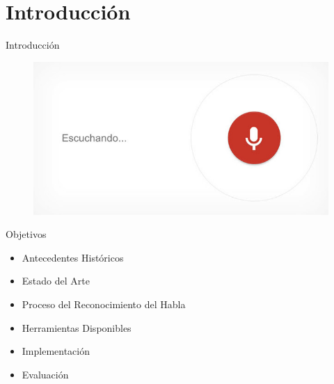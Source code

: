 \section{Introducci\'on}

\begin{frame}{Introducci\'on}

\begin{figure}[H]
\centering
\includegraphics[width=0.7\linewidth]{./graphics/speech_intro.jpg}
\end{figure}


\end{frame}

\begin{frame}{Objetivos}
\begin{itemize}
    \item Antecedentes Hist\'oricos
    \item Estado del Arte
    \item Proceso del Reconocimiento del Habla
    \item Herramientas Disponibles
    \item Implementaci\'on
    \item Evaluaci\'on
\end{itemize}
\end{frame}